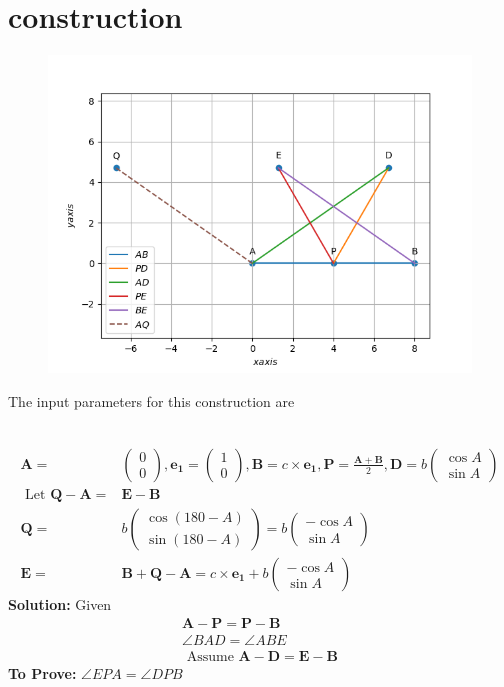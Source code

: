 \documentclass[10pt]{article}
\newcommand{\solution}{\noindent \textbf{Solution: }}
\newcommand{\myvec}[1]{\ensuremath{\begin{pmatrix}#1\end{pmatrix}}}
\let\vec\mathbf{}
\begin{document}
\section{construction}
\begin{figure}[h!]
	\begin{center}
		\includegraphics[width=5in]{./figs/fig.png}
	\end{center}
\caption{}
\label{fig:Fig1}
\end{figure}
The input parameters for this construction are\\
\begin{table}[h!]
	\centering
 	
\caption{}
\label{table}
\end{table}\\
\begin{align}
\vec{A}=&\myvec{0\\0},\vec{e_1}=\myvec{1\\0},\vec{B}=c\times\vec{e_1},\vec{P}=\frac{\vec{A}+\vec{B}}{2},\vec{D}=b\myvec{\cos{A}\\\sin{A}}\\
\text{ Let  }\vec{Q}-\vec{A} =&\vec{E}-\vec{B}\\
\vec{Q}=&b\myvec{\cos{(180-A)}\\\sin{(180-A)}}=b\myvec{-\cos{A}\\\sin{A}}\\
\vec{E}=&\vec{B}+\vec{Q}-\vec{A}=c\times\vec{e_1}+b\myvec{-\cos{A}\\\sin{A}}
\end{align}
\solution
Given\\
\begin{align}
\vec{A}-\vec{P} = \vec{P}-\vec{B}\\
\angle BAD = \angle ABE\\
\text { Assume  }\vec{A}-\vec{D}=\vec{E}-\vec{B}
\end{align}
\textbf{To Prove:}  $\angle EPA = \angle DPB$
\end{document}
